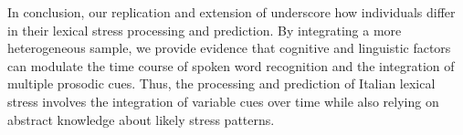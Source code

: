 In conclusion, our replication and extension of \cite{Sulpizio_McQueen_2012} underscore how individuals differ in their lexical stress processing and prediction. By integrating a more heterogeneous sample, we provide evidence that cognitive and linguistic factors can modulate the time course of spoken word recognition and the integration of multiple prosodic cues. Thus, the processing and prediction of Italian lexical stress involves the integration of variable cues over time while also relying on abstract knowledge about likely stress patterns.

